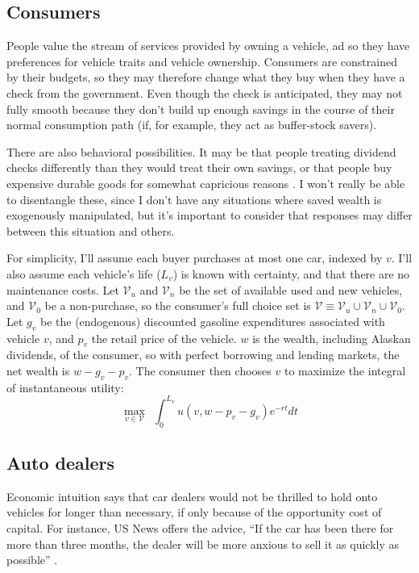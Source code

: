 \documentclass[11pt,letterpaper,oneside]{article}
\begin{document}
\begin{doublespacing}

\subsection{Consumers}


People value the stream of services provided by owning a vehicle, ad so they have preferences for vehicle traits and vehicle ownership.
Consumers are constrained by their budgets, so they may therefore change what they buy when they have a check from the government.
Even though the check is anticipated, they may not fully smooth because they don't build up enough savings in the course of their normal consumption path (if, for example, they act as buffer\hyp{}stock savers).

There are also behavioral possibilities.
It may be that people treating dividend checks differently than they would treat their own savings, or that people buy expensive durable goods for somewhat capricious reasons \parencite{Busse2015_weather_on_cars}.
I won't really be able to disentangle these, since I don't have any situations where saved wealth is exogenously manipulated, but it's important to consider that responses may differ between this situation and others.

For simplicity, I'll assume each buyer purchases at most one car, indexed by $v$.
I'll also assume each vehicle's life ($L_v$) is known with certainty, and that there are no maintenance costs.
Let $\mathcal{V}_u$ and $\mathcal{V}_n$ be the set of available used and new vehicles, and $\mathcal{V}_0$ be a non\hyp{}purchase, so the consumer's full choice set is $\mathcal{V} \equiv \mathcal{V}_u \cup \mathcal{V}_n \cup \mathcal{V}_0$.
Let $g_v$ be the (endogenous) discounted gasoline expenditures associated with vehicle $v$, and $p_v$ the retail price of the vehicle.
$w$ is the wealth, including Alaskan dividends, of the consumer, so with perfect borrowing and lending markets, the net wealth is $w - g_v - p_v$.
The consumer then chooses $v$ to maximize the integral of instantaneous utility:
\[
\max_{v \in \mathcal{V}} \ \ \int_0^{L_v} u(v, w - p_v - g_v) e^{-rt} dt
\]

\subsection{Auto dealers}

Economic intuition says that car dealers would not be thrilled to hold onto vehicles for longer than necessary, if only because of the opportunity cost of capital.
For instance, US News offers the advice, ``If the car has been there for more than three months, the dealer will be more anxious to sell it as quickly as possible''
\parencite{usnews_car_deals}.


\end{doublespacing}
\end{document}
